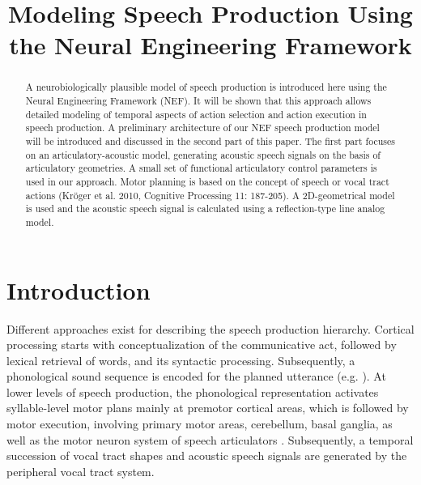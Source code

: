\documentclass[conference]{IEEEtran}
\begin{document}
\title{Modeling Speech Production Using\\
  the Neural Engineering Framework}

\author{
\and
{}
}

\maketitle

\begin{abstract}
  A neurobiologically plausible model of speech production is
  introduced here using the Neural Engineering Framework (NEF).
  It will be shown that this approach allows
  detailed modeling of temporal aspects of action selection and action
  execution in speech production. A preliminary architecture of our
  NEF speech production model will be introduced and discussed in
  the second part of this paper. The first part focuses on an
  articulatory-acoustic model, generating acoustic speech signals on
  the basis of articulatory geometries. A small set of functional
  articulatory control parameters is used in our approach. Motor
  planning is based on the concept of speech or vocal tract actions
  (Kr\"{o}ger et al. 2010, Cognitive Processing 11: 187-205). A
  2D-geometrical model is used and the acoustic speech signal is
  calculated using a reflection-type line analog model.
\end{abstract}

\IEEEpeerreviewmaketitle

\section{Introduction}

Different approaches exist for describing the speech production
hierarchy. Cortical processing starts with conceptualization of the
communicative act, followed by lexical retrieval of words, and its
syntactic processing. Subsequently, a phonological sound sequence is
encoded for the planned utterance (e.g. \cite{levelt1999}). At lower
levels of speech production, the phonological representation activates
syllable-level motor plans mainly at premotor cortical areas, which is
followed by motor execution, involving primary motor areas,
cerebellum, basal ganglia, as well as the motor neuron system of
speech articulators \cite{riecker2005}. Subsequently, a temporal
succession of vocal tract shapes and acoustic speech signals are
generated by the peripheral vocal tract system.
\end{document}
